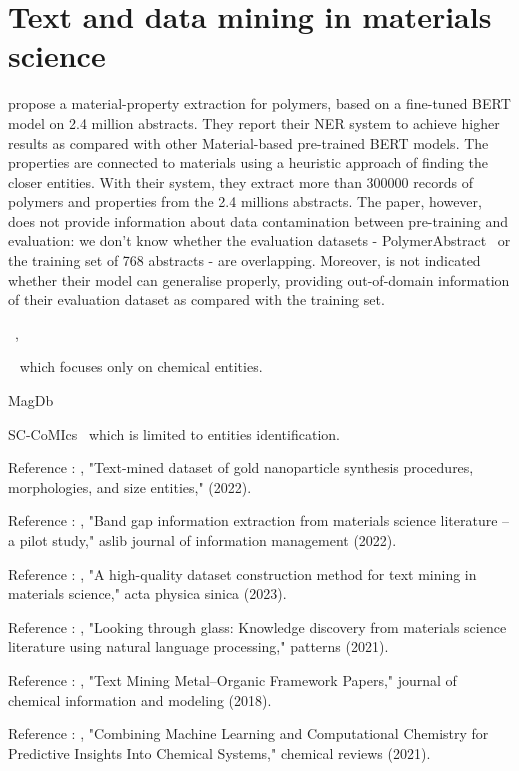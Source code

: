 \documentclass[12pt, a4paper]{report}
\begin{document}
\section{Text and data mining in materials science}

\cite{pranav2023a} propose a material-property extraction for polymers, based on a fine-tuned BERT model on 2.4 million abstracts. They report their NER system to achieve higher results as compared with other Material-based pre-trained BERT models. The properties are connected to materials using a heuristic approach of finding the closer entities.
With their system, they extract more than 300000 records of polymers and properties from the 2.4 millions abstracts. 
The paper, however, does not provide information about data contamination between pre-training and evaluation: we don't know whether the evaluation datasets - PolymerAbstract~\cite{huan2016a} or the training set of 768 abstracts - are overlapping. 
Moreover, is not indicated whether their model can generalise properly, providing out-of-domain information of their evaluation dataset as compared with the training set. 


~\cite{kononova_text-mined_2019}, 

~\cite{court2018auto} which focuses only on chemical entities. 

MagDb~\cite{court_magnetic_2020}

SC-CoMIcs~\cite{yamaguchi-etal-2020-sc} which is limited to entities identification.

Reference \cite{cruse2022text}: , "Text-mined dataset of gold nanoparticle synthesis procedures, morphologies, and size entities,"  (2022).

Reference \cite{band2022ghosh}: , "Band gap information extraction from materials science literature – a pilot study," aslib journal of information management (2022).

Reference \cite{yue2023ahigh}: , "A high-quality dataset construction method for text mining in materials science," acta physica sinica (2023). 

Reference \cite{venugopal2021looking}: , "Looking through glass: Knowledge discovery from materials science literature using natural language processing," patterns (2021). 

Reference \cite{park2018text}: , "Text Mining Metal–Organic Framework Papers," journal of chemical information and modeling (2018).

Reference \cite{keith2021combining}: , "Combining Machine Learning and Computational Chemistry for Predictive Insights Into Chemical Systems," chemical reviews (2021). 
\end{document}

